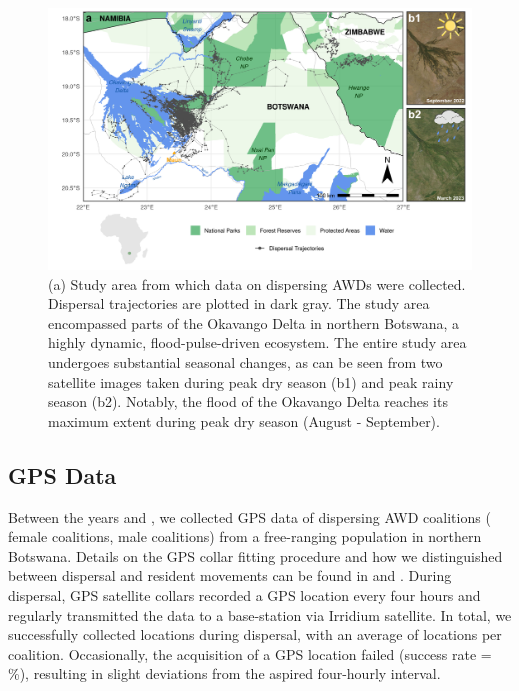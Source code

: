 \documentclass[abstract=on,10pt,a4paper,bibliography=totocnumbered]{article}
\newcommand{\inputy}[1]{\unskip}
\begin{document}
\begin{figure}
 \begin{center}
  \includegraphics[width = \textwidth]{Figures/StudyArea.png} \caption{(a) Study
  area from which data on dispersing AWDs were collected. Dispersal trajectories
  are plotted in dark gray. The study area encompassed parts of the Okavango
  Delta in northern Botswana, a highly dynamic, flood-pulse-driven ecosystem.
  The entire study area undergoes substantial seasonal changes, as can be seen
  from two satellite images taken during peak dry season (b1) and peak rainy
  season (b2). Notably, the flood of the Okavango Delta reaches its maximum
  extent during peak dry season (August - September).}
  \label{StudyArea}
 \end{center}
\end{figure}

\subsection{GPS Data}

Between the years \inputy{GeneralMetrics/GPSFromYear} and
\inputy{GeneralMetrics/GPSToYear}, we collected GPS data of
\inputy{GeneralMetrics/CollarsTotal} dispersing AWD coalitions
(\inputy{GeneralMetrics/CollarsFemales} female coalitions,
\inputy{GeneralMetrics/CollarsMales} male coalitions) from a free-ranging
population in northern Botswana. Details on the GPS collar fitting procedure and
how we distinguished between dispersal and resident movements can be found in
\citet{Cozzi.2020} and \citet{Hofmann.2021}. During dispersal, GPS satellite
collars recorded a GPS location every four hours and regularly transmitted the
data to a base-station via Irridium satellite. In total, we successfully
collected \inputy{GeneralMetrics/FixesTotal} locations during dispersal, with an
average of \inputy{GeneralMetrics/FixesMeanSD} locations per coalition.
Occasionally, the acquisition of a GPS location failed (success rate =
\inputy{GeneralMetrics/AcquisitionRate}\%), resulting in slight deviations from
the aspired four-hourly interval.
\end{document}

